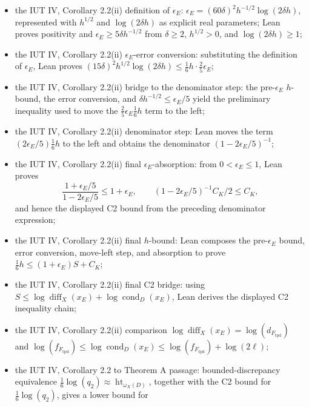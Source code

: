 \documentclass[11pt]{article}
\begin{document}
\begin{itemize}
  \(\frac16\log(q)\le\frac16\log(q_2)\le\frac16\log(q_\forall)\le
   (1+\epsilon_E)(\log\operatorname{diff}_X+\log\operatorname{cond}_D)+C_K\);
\item the IUT IV, Corollary 2.2(ii) definition of \(\epsilon_E\):
  \(\epsilon_E=(60\delta)^2h^{-1/2}\log(2\delta h)\), represented with
  \(h^{1/2}\) and \(\log(2\delta h)\) as explicit real parameters; Lean proves
  positivity and \(\epsilon_E\ge5\delta h^{-1/2}\) from
  \(\delta\ge2\), \(h^{1/2}>0\), and \(\log(2\delta h)\ge1\);
\item the IUT IV, Corollary 2.2(ii) \(\epsilon_E\)-error conversion:
  substituting the definition of \(\epsilon_E\), Lean proves
  \((15\delta)^2h^{1/2}\log(2\delta h)
   \le \frac16h\cdot\frac25\epsilon_E\);
\item the IUT IV, Corollary 2.2(ii) bridge to the denominator step:
  the pre-\(\epsilon_E\) \(h\)-bound, the error conversion, and
  \(\delta h^{-1/2}\le\epsilon_E/5\) yield the preliminary inequality used to
  move the \(\frac25\epsilon_E\frac16h\) term to the left;
\item the IUT IV, Corollary 2.2(ii) denominator step:
  Lean moves the term
  \((2\epsilon_E/5)\frac16h\) to the left and obtains the denominator
  \((1-2\epsilon_E/5)^{-1}\);
\item the IUT IV, Corollary 2.2(ii) final \(\epsilon_E\)-absorption:
  from \(0<\epsilon_E\le1\), Lean proves
  \[
    \frac{1+\epsilon_E/5}{1-2\epsilon_E/5}\le1+\epsilon_E,
    \qquad
    (1-2\epsilon_E/5)^{-1}C_K/2\le C_K,
  \]
  and hence the displayed C2 bound from the preceding denominator expression;
\item the IUT IV, Corollary 2.2(ii) final \(h\)-bound:
  Lean composes the pre-\(\epsilon_E\) bound, error conversion, move-left step,
  and absorption to prove
  \(\frac16h\le(1+\epsilon_E)S+C_K\);
\item the IUT IV, Corollary 2.2(ii) final C2 bridge:
  using \(S\le\log\operatorname{diff}_X(x_E)+\log\operatorname{cond}_D(x_E)\),
  Lean derives the displayed C2 inequality chain;
\item the IUT IV, Corollary 2.2(ii) comparison
  \(\log\operatorname{diff}_X(x_E)=\log(d_{F_{\mathrm{tpd}}})\) and
  \(\log(f_{F_{\mathrm{tpd}}})\le\log\operatorname{cond}_D(x_E)\le
   \log(f_{F_{\mathrm{tpd}}})+\log(2\ell)\);
\item the IUT IV, Corollary 2.2 to Theorem A passage:
  bounded-discrepancy equivalence
  \(\frac16\log(q_2)\approx\operatorname{ht}_{\omega_X(D)}\), together with the
  C2 bound for \(\frac16\log(q_2)\), gives a lower bound for

\end{itemize}
\end{document}
